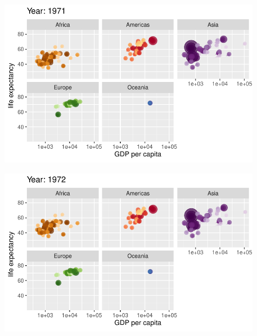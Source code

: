 \documentclass[
  letterpaper,
  DIV=11,
  numbers=noendperiod]{scrartcl}
\begin{document}
\begin{figure}[H]

{\centering \includegraphics{class05_files/figure-pdf/unnamed-chunk-24-36.pdf}

}

\end{figure}

\begin{figure}[H]

{\centering \includegraphics{class05_files/figure-pdf/unnamed-chunk-24-37.pdf}

}

\end{figure}
\end{document}
